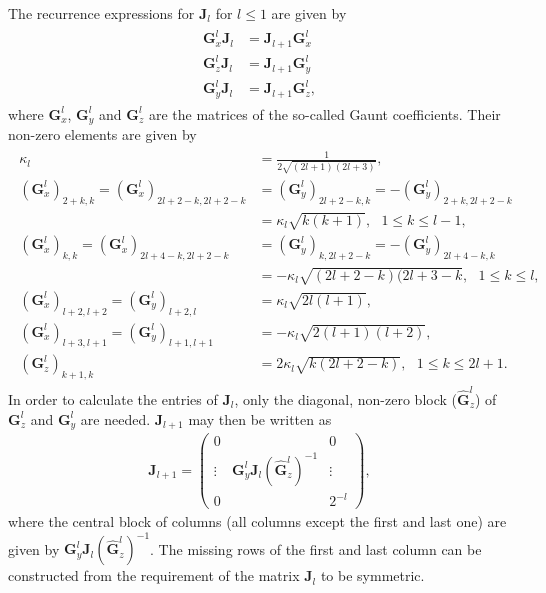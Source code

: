 The recurrence expressions for $\pmb{J}_l$ for $l \leq 1$ are given by
\begin{align}
  \begin{split}
    \pmb{G}^l_x \pmb{J}_l &= \pmb{J}_{l+1}\pmb{G}^l_x\\
    \pmb{G}^l_z \pmb{J}_l &= \pmb{J}_{l+1}\pmb{G}^l_y\\
    \pmb{G}^l_y \pmb{J}_l &= \pmb{J}_{l+1}\pmb{G}^l_z,
  \end{split}
  \label{eq:GauntTransformation}
\end{align}
where $\pmb{G}^l_x$, $\pmb{G}^l_y$ and $\pmb{G}^l_z$ are the matrices of the so-called Gaunt coefficients. Their
non-zero elements are given by
\begin{align}
  \begin{split}
    \kappa_l &= \frac{1}{2\sqrt{(2l+1)(2l+3)}},\\
    \left(\pmb{G}^l_x\right)_{2+k,k} = \left(\pmb{G}^l_x\right)_{2l+2-k,2l+2-k}&
    = \left(\pmb{G}^l_y\right)_{2l+2-k,k} = -\left(\pmb{G}^l_y\right)_{2+k,2l+2-k}\\
    &= \kappa_l\sqrt{k(k+1)},
    ~~~1\leq k \leq l-1,\\
    \left(\pmb{G}^l_x\right)_{k,k} = \left(\pmb{G}^l_x\right)_{2l+4-k,2l+2-k}
    &= \left(\pmb{G}^l_y\right)_{k,2l+2-k} = -\left(\pmb{G}^l_y\right)_{2l+4-k,k}\\
    &=-\kappa_l \sqrt{(2l+2-k)(2l+3-k},
    ~~~1\leq k \leq l,\\
    \left(\pmb{G}^l_x\right)_{l+2,l+2} = \left(\pmb{G}^l_y\right)_{l+2,l} &= \kappa_l \sqrt{2l(l+1)},\\
    \left(\pmb{G}^l_x\right)_{l+3,l+1} = \left(\pmb{G}^l_y\right)_{l+1,l+1} &= -\kappa_l \sqrt{2(l+1)(l+2)},\\
    \left(\pmb{G}^l_z\right)_{k+1,k} &= 2\kappa_l \sqrt{k(2l+2-k)},~~~ 1 \leq k \leq 2l+1.
  \end{split}
\end{align}
In order to calculate the entries of $\pmb{J}_l$, only the diagonal, non-zero block ($\hat{\pmb{G}}^l_z$)
of $\pmb{G}^l_z$ and $\pmb{G}^l_y$ are needed. $\pmb{J}_{l+1}$ may then be written as
\begin{align}
  \pmb{J}_{l+1} = \begin{pmatrix}
                    0      & ~ & 0 \\
                    \vdots &  \pmb{G}^l_y \pmb{J}_{l} \left(\hat{\pmb{G}}^l_z\right)^{-1} & \vdots\\
                    0      & ~ & 2^{-l}
                  \end{pmatrix},
  \label{eq:Recurrence}
\end{align}
where the central block of columns (all columns except the first and last one) are given by
$\pmb{G}^l_y \pmb{J}_{l} \left(\hat{\pmb{G}}^l_z\right)^{-1}$. The missing rows of the first and last column
can be constructed from the requirement of the matrix $\pmb{J}_{l}$ to be symmetric.

